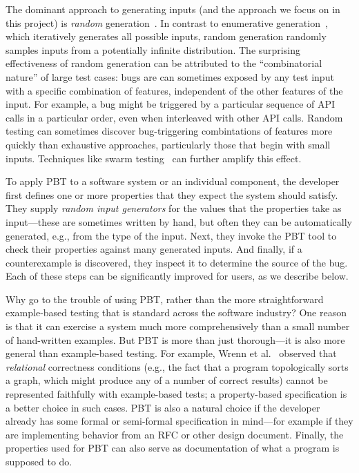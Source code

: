 The dominant approach to generating inputs (and the approach we focus on in this
project) is {\em random}
generation~\cite{hamlet1994random}. In contrast to enumerative
generation~\cite{DBLP:conf/haskell/RuncimanNL08, leancheck}, which iteratively
generates all possible inputs, random generation randomly samples inputs from a
potentially infinite distribution. The
surprising effectiveness of random generation can be attributed to the
``combinatorial nature'' of large test cases: bugs are
can sometimes exposed by any test input with a specific combination
of features, independent of the other features of the input. For example, a bug might be triggered by a particular
sequence of API calls in a particular order, even when
interleaved with other API calls. Random testing can sometimes
discover bug-triggering combintations of features more quickly than
exhaustive approaches, particularly those that begin with small inputs. Techniques like swarm
testing~\cite{groce2012swarm} can further amplify this effect.

\smallskip

To apply PBT to a software system or an individual component, the
developer first defines one or more properties that they expect the
system should satisfy.  They supply {\em random input generators} for
the values that the properties take as input---these are sometimes
written by hand, but often they can be automatically generated, e.g.,
from the type of the input. Next, they invoke the PBT tool to check
their properties against many generated inputs. And finally, if a
counterexample is discovered, they inspect it to determine the source
of the bug.  Each of these steps can be significantly improved for
users, as we describe below.

Why go to the trouble of using PBT, rather than the more straightforward
example-based testing that is standard across the software industry?
One reason is that it can exercise a system much more
comprehensively than a small number of hand-written examples.
But
PBT is more than just thorough---it is also more general than example-based
testing. For example, Wrenn et al.~\cite{wrenn2021using} observed that
{\em relational} correctness conditions (e.g., the fact that a program
topologically sorts a graph, which might
produce any of a number of correct results) cannot be represented
faithfully with example-based tests; a property-based specification is
a better choice in such cases.
%
PBT is also
a natural choice if
the developer already has some formal or semi-formal
specification in mind---for example if they are implementing behavior from an RFC or
other design document.
Finally, the
properties used for PBT can also serve as documentation of what a
program is supposed to do.

